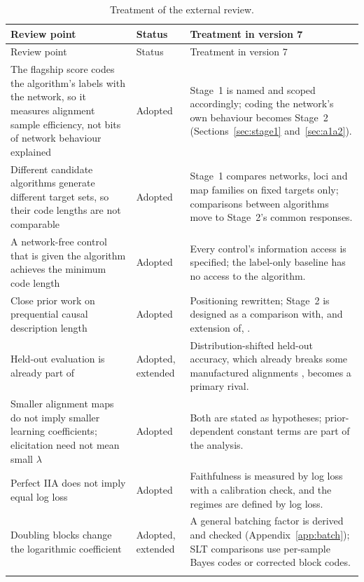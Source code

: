 \documentclass[11pt,a4paper]{article}
\begin{document}
\begin{longtable}{@{}P{5.0cm}P{1.9cm}P{7.8cm}@{}}
\caption{Treatment of the external review.}\label{tab:review}\\
\toprule
Review point & Status & Treatment in version 7 \\
\midrule
\endfirsthead
\toprule
Review point & Status & Treatment in version 7 \\
\midrule
\endhead
The flagship score codes the algorithm's labels with the network, so it
measures alignment sample efficiency, not bits of network behaviour
explained & Adopted & Stage~1 is named and scoped accordingly; coding the
network's own behaviour becomes Stage~2 (Sections~\ref{sec:stage1}
and~\ref{sec:a1a2}). \\ \addlinespace
Different candidate algorithms generate different target sets, so their
code lengths are not comparable & Adopted & Stage~1 compares networks, loci
and map families on fixed targets only; comparisons between algorithms
move to Stage~2's common responses. \\ \addlinespace
A network-free control that is given the algorithm achieves the minimum
code length & Adopted & Every control's information access is specified;
the label-only baseline has no access to the algorithm. \\ \addlinespace
Close prior work on prequential causal description length & Adopted &
Positioning rewritten; Stage~2 is designed as a comparison with, and
extension of, \cite{ma2026}. \\ \addlinespace
Held-out evaluation is already part of \cite{sutter2025} & Adopted,
extended & Distribution-shifted held-out accuracy, which already breaks
some manufactured alignments \cite{sutter2025}, becomes a primary rival. \\
\addlinespace
Smaller alignment maps do not imply smaller learning coefficients;
elicitation need not mean small $\lambda$ & Adopted & Both are stated as
hypotheses; prior-dependent constant terms are part of the analysis. \\
\addlinespace
Perfect IIA does not imply equal log loss & Adopted & Faithfulness is
measured by log loss with a calibration check, and the regimes are defined
by log loss. \\ \addlinespace
Doubling blocks change the logarithmic coefficient & Adopted, extended & A
general batching factor is derived and checked
(Appendix~\ref{app:batch}); SLT comparisons use per-sample Bayes codes or
corrected block codes. \\ \addlinespace

\end{longtable}
\end{document}
